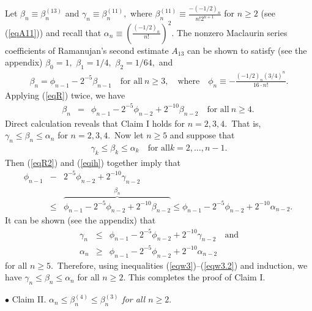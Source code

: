 \documentclass[final,oneeqnum]{siamltex}
\begin{document}
\noindent Let $\beta_{n}\equiv  \beta^{(13)}_{n}$ and
 $\gamma_{n} \equiv  \beta^{(11)}_{n},$ where
 $\beta^{(11)}_{n}  \equiv \frac{-(-1/2)_{n}}{n!2^{n+1}}$  for
$n\geq 2$ (see (\ref{eqA11})) and recall that
$\alpha_{n}\equiv (\frac{(-1/2)_{n}}{n!})^{2}$.
The nonzero Maclaurin series coefficients of Ramanujan's
second estimate $A_{13}$ can be shown to satisfy
 (see the appendix)
 $\beta_{0}=1,$ $\beta_{1}=1/4,$  $\beta_{2}=1/64,$ and
\begin{eqnarray}
\beta_{n}   = \phi_{n-1} - 2^{-5}\beta_{n-1} \quad  \mbox{for all}
\ n\geq 3, \quad \mbox{where} \quad \phi_{n} \equiv -
\frac{(-1/2)_{n}(3/4)^n}{16\cdot n!}.\label{eqR}
\end{eqnarray} 
Applying (\ref{eqR}) twice,  we have
\begin{eqnarray}
\beta_{n} &=&\phi_{n-1} - 2^{-5}\phi_{n-2} + 2^{-10}\beta_{n-2} \quad
\mbox{for all} \ n\geq 4.\ \label{eqR2}
\end{eqnarray} 
Direct calculation reveals that Claim I holds for
$n=2,3, 4$.\ That is,
$\gamma_{n} \leq  \beta_{n} \leq \alpha_{n}$ for $n=2,3, 4$.\ Now let
$n\geq 5$ and suppose that
\begin{eqnarray}
\gamma_{k} \leq  \beta_{k}\leq \alpha_{k} \quad \mbox{for all
$k=2,\ldots,n-1.$} \label{eqih}
\end{eqnarray} 
Then (\ref{eqR2}) and (\ref{eqih}) together imply that
\begin{eqnarray}
\phi_{n-1} &-& 2^{-5}\phi_{n-2} + 2^{-10}\gamma_{n-2} \nonumber \\ &\leq& 
\overbrace{\phi_{n-1} - 2^{-5}\phi_{n-2} + 2^{-10}\beta_{n-2}}^{\beta_{n}} 
\leq \phi_{n-1} - 2^{-5}\phi_{n-2} + 2^{-10}\alpha_{n-2}.\ \label{eqw3}
\end{eqnarray} 
It  can be shown (see the appendix) that
\begin{eqnarray}
\gamma_{n}&\leq& \phi_{n-1} - 2^{-5}\phi_{n-2} + 2^{-10}\gamma_{n-2}
 \quad  \mbox{and} \label{eqw3.1}\\
 \alpha_{n}&\geq& \phi_{n-1} - 2^{-5}\phi_{n-2} + 2^{-10}\alpha_{n-2}
\label{eqw3.2}
\end{eqnarray} 
for all  $n\geq 5$.\ Therefore, using inequalities
 (\ref{eqw3})--(\ref{eqw3.2}) and induction, we have
$\gamma_{n} \leq \beta_{n} \leq \alpha_{n}$ for all $n\geq 2$.
This completes the proof of  Claim I.

\noindent$\bullet$  Claim II. {\em $\displaystyle   \alpha_{n}\leq
\beta^{(4)}_{n} \leq
 \beta^{(3)}_{n}$ for all $n\geq 2$}.
\vspace{.15in}
\end{document}
